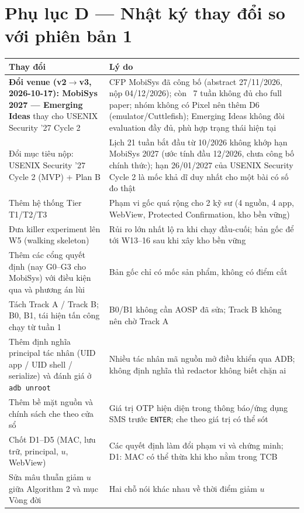 \documentclass[11pt,a4paper]{article}
\newcommand{\code}[1]{\texttt{\small #1}}
\begin{document}
\section{Phụ lục D --- Nhật ký thay đổi so với phiên bản 1}

\begin{longtable}{@{}p{4.6cm}p{10.2cm}@{}}
\toprule
\textbf{Thay đổi} & \textbf{Lý do} \\
\midrule
\endhead
\textbf{Đổi venue (v2$\to$v3, 2026-10-17): MobiSys 2027 --- Emerging Ideas} thay cho USENIX Security '27 Cycle 2 & CFP MobiSys đã công bố (abstract 27/11/2026, nộp 04/12/2026); còn ~7 tuần không đủ cho full paper; nhóm không có Pixel nên thêm D6 (emulator/Cuttlefish); Emerging Ideas không đòi evaluation đầy đủ, phù hợp trạng thái hiện tại \\
Đổi mục tiêu nộp: USENIX Security '27 Cycle 2 (MVP) + Plan B & Lịch 21 tuần bắt đầu từ 10/2026 không khớp hạn MobiSys 2027 (ước tính đầu 12/2026, chưa công bố chính thức); hạn 26/01/2027 của USENIX Security Cycle 2 là mốc khả dĩ duy nhất cho một bài có số đo thật \\
Thêm hệ thống Tier T1/T2/T3 & Phạm vi gốc quá rộng cho 2 kỹ sư (4 nguồn, 4 app, WebView, Protected Confirmation, kho bền vững) \\
Đưa killer experiment lên W5 (walking skeleton) & Rủi ro lớn nhất lộ ra khi chạy đầu-cuối; bản gốc để tới W13--16 sau khi xây kho bền vững \\
Thêm các cổng quyết định (nay G0--G3 cho MobiSys) với điều kiện qua và phương án lùi & Bản gốc chỉ có mốc sản phẩm, không có điểm cắt \\
Tách Track A / Track B; B0, B1, tái hiện tấn công chạy từ tuần 1 & B0/B1 không cần AOSP đã sửa; Track B không nên chờ Track A \\
Thêm định nghĩa principal tác nhân (UID app / UID shell / serialize) và đánh giá ở \code{adb unroot} & Nhiều tác nhân mã nguồn mở điều khiển qua ADB; không định nghĩa thì redactor không biết chặn ai \\
Thêm bề mặt nguồn và chính sách che theo cửa sổ & Giá trị OTP hiện diện trong thông báo/ứng dụng SMS trước \code{ENTER}; che theo giá trị có thể sót \\
Chốt D1--D5 (MAC, lưu trữ, principal, $u$, WebView) & Các quyết định làm đổi phạm vi và chứng minh; D1: MAC có thể thừa khi kho nằm trong TCB \\
Sửa mâu thuẫn giảm $u$ giữa Algorithm 2 và mục Vòng đời & Hai chỗ nói khác nhau về thời điểm giảm $u$ \\

\end{longtable}
\end{document}
